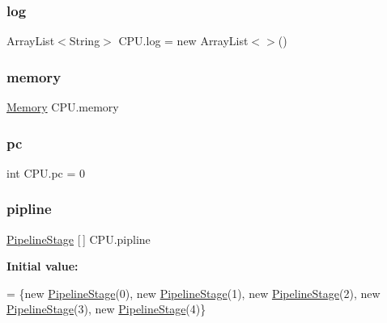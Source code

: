 \mbox{\label{class_c_p_u_a8af34fe6dd70f31621f0a9e9773ac564}} 
\subsubsection{\texorpdfstring{log}{log}}
{\footnotesize\ttfamily Array\+List$<$String$>$ C\+P\+U.\+log = new Array\+List$<$$>$()\hspace{0.3cm}{\ttfamily [private]}}

\mbox{\label{class_c_p_u_ab4c72eef96047317697752abe6b63d43}} 
\subsubsection{\texorpdfstring{memory}{memory}}
{\footnotesize\ttfamily \mbox{\hyperlink{class_memory}{Memory}} C\+P\+U.\+memory\hspace{0.3cm}{\ttfamily [private]}}

\mbox{\label{class_c_p_u_ae44745460dee6c02a03992ce4b21737f}} 
\subsubsection{\texorpdfstring{pc}{pc}}
{\footnotesize\ttfamily int C\+P\+U.\+pc = 0\hspace{0.3cm}{\ttfamily [private]}}

\mbox{\label{class_c_p_u_acf600c50fec0b0ecacf8797c1995c612}} 
\subsubsection{\texorpdfstring{pipline}{pipline}}
{\footnotesize\ttfamily \mbox{\hyperlink{class_pipeline_stage}{Pipeline\+Stage}} \mbox{[}$\,$\mbox{]} C\+P\+U.\+pipline\hspace{0.3cm}{\ttfamily [private]}}

{\bfseries Initial value\+:}
\begin{DoxyCode}
= \{\textcolor{keyword}{new} \mbox{\hyperlink{class_pipeline_stage}{PipelineStage}}(0),        
            \textcolor{keyword}{new} \mbox{\hyperlink{class_pipeline_stage}{PipelineStage}}(1),
            \textcolor{keyword}{new} \mbox{\hyperlink{class_pipeline_stage}{PipelineStage}}(2),
            \textcolor{keyword}{new} \mbox{\hyperlink{class_pipeline_stage}{PipelineStage}}(3),
            \textcolor{keyword}{new} \mbox{\hyperlink{class_pipeline_stage}{PipelineStage}}(4)\}
\end{DoxyCode}
\mbox{\label{class_c_p_u_ad0e0d3c3fba51527836b44298c726438}} 
